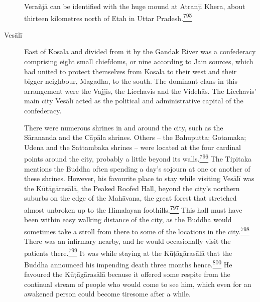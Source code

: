 \begin{description}
Verañjā can be identified with the huge mound at Atranji Khera, about
thirteen kilometres north of Etah in Uttar
Pradesh.\label{footprints_split_019.html_fnref795}\hyperref[footprints_split_025.htmlux5cux23fn795]{\textsuperscript{795}}
\item[Vesālī]
East of Kosala and divided from it by the Gandak River was a confederacy
comprising eight small chiefdoms, or nine according to Jain sources,
which had united to protect themselves from Kosala to their west and
their bigger neighbour, Magadha, to the south. The dominant clans in
this arrangement were the Vajjis, the Licchavis and the Videhās. The
Licchavis' main city Vesālī acted as the political and administrative
capital of the confederacy.

There were numerous shrines in and around the city, such as the
Sārananda and the Cāpāla shrines. Others -- the Bahuputta; Gotamaka;
Udena and the Sattambaka shrines -- were located at the four cardinal
points around the city, probably a little beyond its
walls.\label{footprints_split_019.html_fnref796}\hyperref[footprints_split_025.htmlux5cux23fn796]{\textsuperscript{796}}
The Tipitaka mentions the Buddha often spending a day's sojourn at one
or another of these shrines. However, his favourite place to stay while
visiting Vesālī was the Kūṭāgārasālā, the Peaked Roofed Hall, beyond the
city's northern suburbs on the edge of the Mahāvana, the great forest
that stretched almost unbroken up to the Himalayan
foothills.\label{footprints_split_019.html_fnref797}\hyperref[footprints_split_025.htmlux5cux23fn797]{\textsuperscript{797}}
This hall must have been within easy walking distance of the city, as
the Buddha would sometimes take a stroll from there to some of the
locations in the
city.\label{footprints_split_019.html_fnref798}\hyperref[footprints_split_025.htmlux5cux23fn798]{\textsuperscript{798}}
There was an infirmary nearby, and he would occasionally visit the
patients
there.\label{footprints_split_019.html_fnref799}\hyperref[footprints_split_025.htmlux5cux23fn799]{\textsuperscript{799}}
It was while staying at the Kūṭāgārasālā that the Buddha announced his
impending death three months
hence.\label{footprints_split_019.html_fnref800}\hyperref[footprints_split_025.htmlux5cux23fn800]{\textsuperscript{800}}
He favoured the Kūṭāgārasālā because it offered some respite from the
continual stream of people who would come to see him, which even for an
awakened person could become tiresome after a while.


\end{description}
